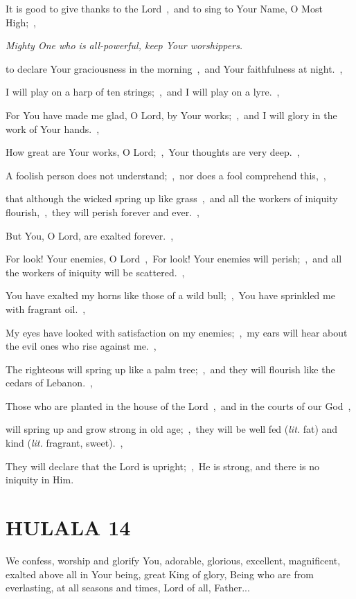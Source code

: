 \documentclass[12pt,twoside,a5paper]{article}
\newcommand{\hulala}[1]{\section*{HULALA {#1}}}
\newcommand{\qanona}[1]{{\liturgicalhint{Qanona.} \emph{#1}}}
\newcommand{\slota}[1]{\liturgicalhint{Slota.} #1}
\newcommand{\translationliteral}[1]{\emph{lit.} #1}
\begin{document}
\begin{normalparskip}
  It is good to give thanks to the Lord~\sep\ and to sing to Your Name, O Most High;~\sep

  \qanona{Mighty One who is all-powerful, keep Your worshippers.}

  to declare Your graciousness in the morning~\sep\ and Your faithfulness at night.~\sep

  I will play on a harp of ten strings;~\sep\ and I will play on a lyre.~\sep

  For You have made me glad, O Lord, by Your works;~\sep\ and I will glory in the work of Your hands.~\sep

  How great are Your works, O Lord;~\sep\ Your thoughts are very deep.~\sep

  A foolish person does not understand;~\sep\ nor does a fool comprehend this,~\sep

  that although the wicked spring up like grass~\sep\ and all the workers of iniquity flourish,~\sep\ they will perish forever and ever.~\sep

  But You, O Lord, are exalted forever.~\sep

  For look! Your enemies, O Lord~\sep\ For look! Your enemies will perish;~\sep\ and all the workers of iniquity will be scattered.~\sep

  You have exalted my horns like those of a wild bull;~\sep\ You have sprinkled me with fragrant oil.~\sep

  My eyes have looked with satisfaction on my enemies;~\sep\ my ears will hear about the evil ones who rise against me.~\sep

  The righteous will spring up like a palm tree;~\sep\ and they will flourish like the cedars of Lebanon.~\sep

  Those who are planted in the house of the Lord~\sep\ and in the courts of our God~\sep

  will spring up and grow strong in old age;~\sep\ they will be well fed (\translationliteral{fat}) and kind (\translationliteral{fragrant, sweet}).~\sep

  They will declare that the Lord is upright;~\sep\ He is strong, and there is no iniquity in Him.
\end{normalparskip}


\hulala{14}

\slota{We confess, worship and glorify You, adorable, glorious, excellent, magnificent, exalted above all in Your being, great King of glory, Being who are from everlasting, at all seasons and times, Lord of all, Father...}
\end{document}
